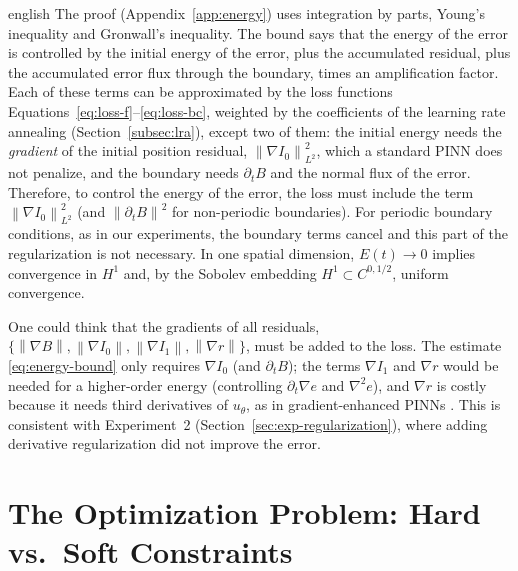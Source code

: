 \documentclass[11pt,letterpaper,twoside,openright]{book} %
\newcommand{\norm}[1]{\left\lVert #1 \right\rVert}
\begin{document}
\begin{hyphenrules}{english}
The proof (Appendix~\ref{app:energy}) uses integration by parts, Young's inequality and Gronwall's inequality.
The bound says that the energy of the error is controlled by the initial energy of the error, plus the
accumulated residual, plus the accumulated error flux through the boundary, times an amplification
factor. Each of these terms can be approximated by the loss functions
Equations~\eqref{eq:loss-f}--\eqref{eq:loss-bc}, weighted by the coefficients of the learning rate annealing
(Section~\ref{subsec:lra}), except two of them: the initial energy needs the \emph{gradient} of the initial
position residual, $\norm{\nabla I_0}^2_{L^2}$, which a standard PINN does not penalize, and the boundary
needs $\partial_tB$ and the normal flux of the error. Therefore, to control the energy of the error, the
loss must include the term $\norm{\nabla I_0}^2_{L^2}$ (and $\norm{\partial_tB}^2$ for non-periodic
boundaries). For periodic boundary conditions, as in our experiments, the boundary terms cancel and this
part of the regularization is not necessary. In one spatial dimension, $E(t)\to0$ implies convergence
in $H^1$ and, by the Sobolev embedding $H^1\subset C^{0,1/2}$, uniform convergence.

\begin{remarkbox}
One could think that the gradients of all residuals,
$\{\norm{\nabla B},\norm{\nabla I_0},\norm{\nabla I_1},\norm{\nabla r}\}$, must be added to the loss.
The estimate \eqref{eq:energy-bound} only requires $\nabla I_0$ (and $\partial_tB$); the terms
$\nabla I_1$ and $\nabla r$ would be needed for a higher-order energy (controlling $\partial_t\nabla e$
and $\nabla^2e$), and $\nabla r$ is costly because it needs third derivatives of $u_\theta$, as in
gradient-enhanced PINNs \cite{yu2022gpinn}. This is consistent with Experiment~2
(Section~\ref{sec:exp-regularization}), where adding derivative regularization did not improve the error.
\end{remarkbox}

\section{The Optimization Problem: Hard vs.\ Soft Constraints}\label{sec:optimization}


\end{hyphenrules}
\end{document}
